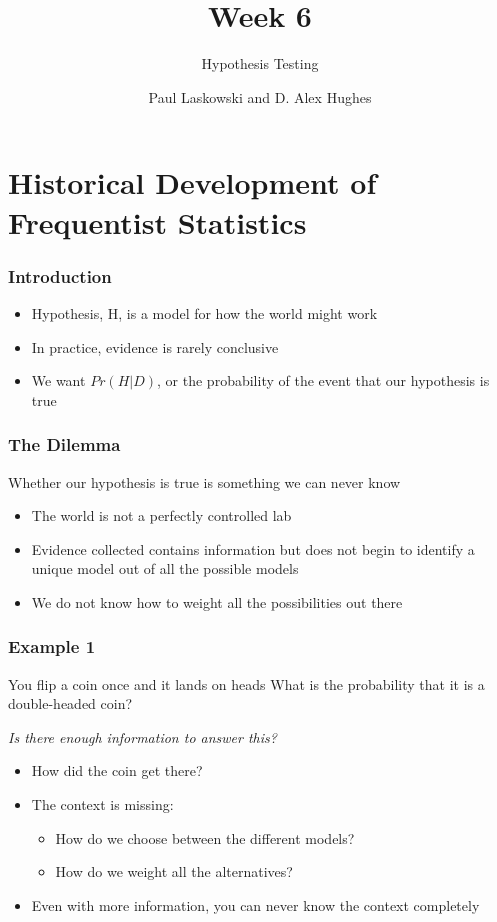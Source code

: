\documentclass[12pt, block=fill]{beamer}
\title{Week 6}
\subtitle{Hypothesis Testing}
\author{Paul Laskowski and D. Alex Hughes}
\institute{UC Berkeley, School of Information}
\begin{document}
\begin{frame}
  \maketitle
\end{frame}

\section{Historical Development of Frequentist Statistics}
\begin{frame}
  \frametitle{Introduction}
  \begin{itemize}
    \item Hypothesis, H, is a model for how the world might work
    \item In practice, evidence is rarely conclusive
    \item We want $Pr(H|D)$, or the probability of the event that our hypothesis is true
  \end{itemize}
\end{frame}


\begin{frame}
  \frametitle{The Dilemma}
     Whether our hypothesis is true is something we can never know 
  \begin{itemize}
    \item The world is not a perfectly controlled lab
    \item Evidence collected contains information but does not begin to identify a unique model out of all the possible models
    \item We do not know how to weight all the possibilities out there
 \end{itemize}
\end{frame}

\begin{frame}
  \frametitle{Example 1}
  \begin{exampleblock}{You flip a coin once and it lands on heads}
    What is the probability that it is a double-headed coin?
  \end{exampleblock}
  \textit{Is there enough information to answer this?}
  \begin{itemize}
    \item How did the coin get there?
    \item The context is missing:
    \begin{itemize}
        \item How do we choose between the different models?
        \item How do we weight all the alternatives?
    \end{itemize}  
    \item Even with more information, you can never know the context completely
  \end{itemize}
\end{frame}
\end{document}
